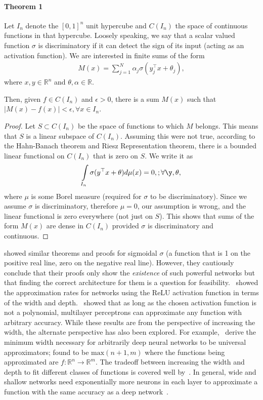 \documentclass[12pt]{exam}
\def\R{\mathbb{R}}
\begin{document}
\begin{questions}
\paragraph{Theorem 1}
\begin{theorem}
Let $I_n$ denote the $[0, 1]^n$ unit hypercube and $C(I_n)$ the space of continuous functions in that hypercube. Loosely speaking, we say that a scalar valued function $\sigma$ is discriminatory if it can detect the sign of its input (acting as an activation function). We are interested in finite sums of the form
\begin{align}
M(x) = \sum\limits_{j=1}^N \alpha_j \sigma(y_j^{\top} x + \theta_j),
\end{align}
where $x,y \in \R^n$ and $\theta, \alpha \in \R$. 
\end{theorem}
Then, given $f \in C(I_n)$ and $\epsilon > 0$, there is a sum $M(x)$ such that $|M(x) - f(x)| < \epsilon, \forall x \in I_n$.
\begin{proof}
Let $S \subset C(I_n)$ be the space of functions to which $M$ belongs. This means that $S$ is a linear subspace of $C(I_n)$. Assuming this were not true, according to the Hahn-Banach theorem and Riesz Representation theorem, there is a bounded linear functional on $C(I_n)$ that is zero on $S$. We write it as
\begin{align}
\int\limits_{I_n} \sigma(y^{\top} x + \theta) d \mu(x) = 0, ; \forall \y, \theta,
\end{align}
where $\mu$ is some Borel measure (required for $\sigma$ to be discriminatory). Since we assume $\sigma$ is discriminatory, therefore $\mu = 0$, our assumption is wrong, and the linear functional is zero everywhere (not just on $S$). This shows that sums of the form $M(x)$ are dense in $C(I_n)$ provided $\sigma$ is discriminatory and continuous.
\end{proof}
\citep{cybenko1989approximation} showed similar theorems and proofs for sigmoidal $\sigma$ (a function that is 1 on the positive real line, zero on the negative real line). However, they cautiously conclude that their proofs only show the \emph{existence} of such powerful networks but that finding the correct architecture for them is a question for feasibility.~\citep{shen2022optimal} showed the approximation rates for networks using the ReLU activation function in terms of the width and depth.~\citep{leshno1993multilayer} showed that as long as the chosen activation function is not a polynomial, multilayer perceptrons can approximate any function with arbitrary accuracy. While these results are from the perspective of increasing the width, the alternate perspective has also been explored. For example,~\citep{lu2017expressive, park2020minimum} derive the minimum width necessary for arbitrarily deep neural networks to be universal approximators; found to be $\text{max}(n + 1, m)$ where the functions being approximated are $f: \R^n \rightarrow \R^m$. The tradeoff between increasing the width and depth to fit different classes of functions is covered well by~\citep{telgarsky2016benefits}. In general, wide and shallow networks need exponentially more neurons in each layer to approximate a function with the same accuracy as a deep network~\cite[Theorem 1.15]{holstermann2023expressive}.


\end{questions}
\end{document}

